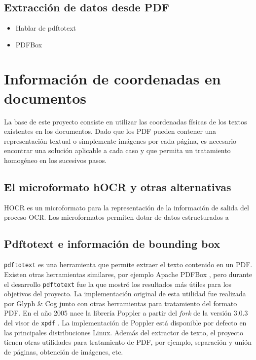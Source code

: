 \subsection{Extracción de datos desde PDF}

\begin{itemize}
    \item Hablar de pdftotext
    \item PDFBox
\end{itemize}

\section{Información de coordenadas en documentos}

La base de este proyecto consiste en utilizar las coordenadas físicas de los textos existentes en los documentos. Dado que los PDF pueden contener una representación textual o simplemente imágenes por cada página, es necesario encontrar una solución aplicable a cada caso y que permita un tratamiento homogéneo en los sucesivos pasos.

\subsection{El microformato hOCR y otras alternativas}

HOCR es un microformato para la representación de la información de salida del proceso OCR. Los microformatos permiten dotar de datos estructurados a 

\subsection{Pdftotext e información de bounding box}

\verb|pdftotext| es una herramienta que permite extraer el texto contenido en un PDF. Existen otras herramientas similares, por ejemplo Apache PDFBox \cite{the_apache_software_foundation_apache_nodate}, pero durante el desarrollo \verb|pdftotext| fue la que mostró los resultados más útiles para los objetivos del proyecto. La implementación original de esta utilidad fue realizada por Glyph \& Cog \cite{glyph__cog_llc_glyph_nodate-1} junto con otras herramientas para tratamiento del formato PDF. En el año 2005 nace la librería Poppler a partir del \emph{fork} de la versión 3.0.3 del visor de \verb|xpdf| \cite{kristian_hogsberg_poppler_2012}. La implementación de Poppler está disponible por defecto en las principales distribuciones Linux. Además del extractor de texto, el proyecto tienen otras utilidades para tratamiento de PDF, por ejemplo, separación y unión de páginas, obtención de imágenes, etc.

